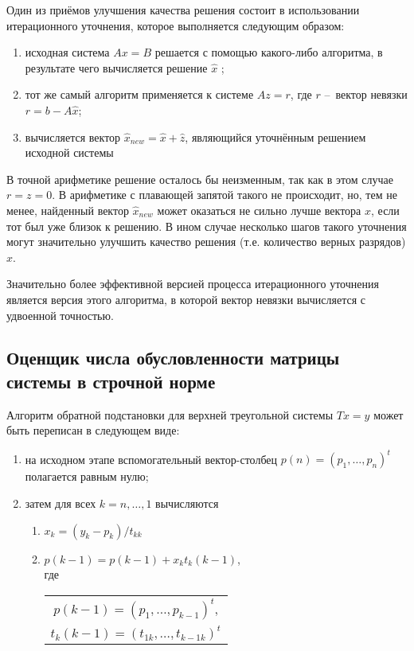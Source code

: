 Один из приёмов улучшения качества решения состоит в использовании итерационного уточнения, которое выполняется следующим образом:

\begin{enumerate}
	\item исходная система $Ax=B$ решается с помощью какого-либо алгоритма, в результате чего вычисляется решение $\hat{x}$ ;
	\item тот же самый алгоритм применяется к системе $Az=r$, где $r$ – вектор невязки $r=b-A\hat{x}$;
	\item вычисляется вектор $\hat{x}_{new} = \hat{x} + \hat{z}$, являющийся уточнённым решением исходной системы
\end{enumerate}

В точной арифметике решение осталось бы неизменным, так как в этом случае $r = z = 0$. В арифметике с плавающей запятой такого не происходит, но, тем не менее, найденный вектор $\hat{x}_{new}$ может оказаться не сильно лучше вектора $\hat{x}$, если тот был уже близок к решению. В ином случае несколько шагов такого уточнения могут значительно улучшить качество решения (т.е. количество верных разрядов) $\hat{x}$.

Значительно более эффективной версией процесса итерационного уточнения является версия этого алгоритма, в которой вектор невязки вычисляется с удвоенной точностью. 


\subsection{Оценщик числа обусловленности матрицы системы в строчной норме}

Алгоритм обратной подстановки для верхней треугольной системы $Tx=y$ может быть переписан в следующем виде:
\begin{enumerate}
	\item на исходном этапе вспомогательный вектор-столбец $p(n)=(p_1, \dots, p_n)^t$ полагается равным нулю;
	\item затем для всех $k=n, \dots, 1$ вычисляются
	\begin{enumerate}
		\item $x_k =(y_k - p_k) / t_{kk}$ 
		\item $p(k-1) = p(k-1) + x_{k}t_{k}(k-1)$, \\ где 
			\begin{tabular}{c}
		 		$p(k-1)=(p_1, \dots, p_{k-1})^t$, \\
		 		$t_k(k-1)=(t_{1k}, \dots, t_{k-1k})^t$ \\
			\end{tabular}
		\end{enumerate}
\end{enumerate}


